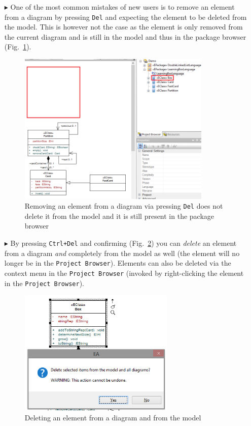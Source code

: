 \begin{enumerate}
\item[$\blacktriangleright$] One of the most common mistakes of new users is to remove an element from a diagram by pressing \texttt{Del} and expecting the
element to be deleted from the model.
This is however not the case as the element is only removed from the current diagram and is still in the model and thus in the package browser
(Fig.~\ref{fig_DelVsCtrlDel01}).

\begin{figure}[htbp]
\begin{center} 
\includegraphics[width=0.87\textwidth]{DelVsCtrlDel1}
  \caption{Removing an element from a diagram via pressing \texttt{Del} does not delete it from the model and it is still present in the package browser}  
    \label{fig_DelVsCtrlDel01}
\end{center}
\end{figure}  

\item[$\blacktriangleright$] By pressing \texttt{Ctrl+Del} and confirming (Fig.~\ref{fig_DelVsCtrlDel02}) you can \emph{delete} an element from a diagram
\emph{and} completely from the model as well (the element will no longer be in the \texttt{Project Browser}). Elements can also be deleted via the context menu
in the \texttt{Project Browser} (invoked by right-clicking the element in the \texttt{Project Browser}).

\begin{figure}[htbp]
\begin{center}
  \includegraphics[width=0.7\textwidth]{DelVsCtrlDel2}
  \caption{Deleting an element from a diagram and from the model}  
  \label{fig_DelVsCtrlDel02}
\end{center}
\end{figure}  

\end{enumerate}
